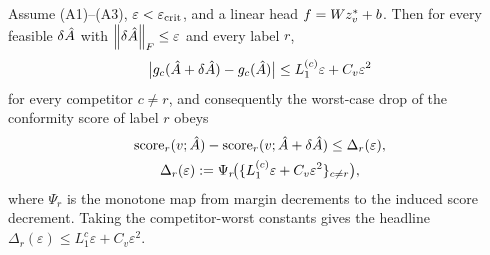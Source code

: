 \begin{lemma}
\label{lem:score-shift}
Assume (A1)--(A3), $\varepsilon<\varepsilon_{\mathrm{crit}}$, and a linear head $f=Wz^{*}_v+b$. Then for every feasible
$\delta\hat{A}$ with $\left\|\delta\hat{A}\right\|_F\le\varepsilon$ and every label $r$,
\begin{equation}
\big|g_c(\hat{A}+\delta\hat{A})-g_c(\hat{A})\big|\le L_1^{(c)}\varepsilon+C_v\varepsilon^2
\label{eq:margin-shift}
\end{equation}
for every competitor $c\ne r$, and consequently the worst-case drop of the conformity score of label
$r$ obeys
\begin{multline}
\mathrm{score}_r(v;\hat{A})-\mathrm{score}_r(v;\hat{A}+\delta\hat{A})\le\Delta_r(\varepsilon),\\
\Delta_r(\varepsilon):=\Psi_r\!\big(\{L_1^{(c)}\varepsilon+C_v\varepsilon^2\}_{c\ne r}\big),
\label{eq:score-drop}
\end{multline}
where $\Psi_r$ is the monotone map from margin decrements to the induced score decrement. Taking the
competitor-worst constants gives the headline $\Delta_r(\varepsilon)\le L_1^{c}\varepsilon+C_v\varepsilon^2$.
\end{lemma}

